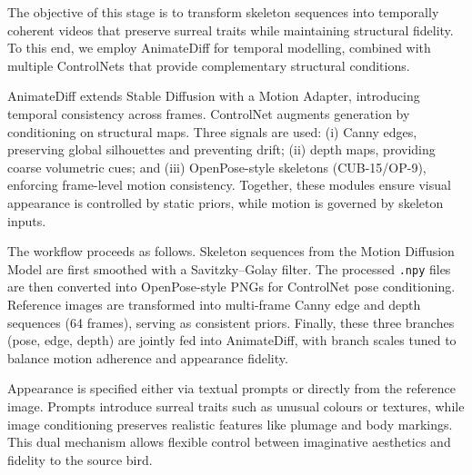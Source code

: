 \documentclass[final-report]{report-template}
\begin{document}

The objective of this stage is to transform skeleton sequences into temporally coherent videos that preserve surreal traits while maintaining structural fidelity. To this end, we employ AnimateDiff for temporal modelling, combined with multiple ControlNets that provide complementary structural conditions.

AnimateDiff extends Stable Diffusion with a Motion Adapter, introducing temporal consistency across frames. ControlNet augments generation by conditioning on structural maps. Three signals are used: (i) Canny edges, preserving global silhouettes and preventing drift; (ii) depth maps, providing coarse volumetric cues; and (iii) OpenPose-style skeletons (CUB-15/OP-9), enforcing frame-level motion consistency. Together, these modules ensure visual appearance is controlled by static priors, while motion is governed by skeleton inputs.

The workflow proceeds as follows. Skeleton sequences from the Motion Diffusion Model are first smoothed with a Savitzky–Golay filter. The processed \texttt{.npy} files are then converted into OpenPose-style PNGs for ControlNet pose conditioning. Reference images are transformed into multi-frame Canny edge and depth sequences (64 frames), serving as consistent priors. Finally, these three branches (pose, edge, depth) are jointly fed into AnimateDiff, with branch scales tuned to balance motion adherence and appearance fidelity.

Appearance is specified either via textual prompts or directly from the reference image. Prompts introduce surreal traits such as unusual colours or textures, while image conditioning preserves realistic features like plumage and body markings. This dual mechanism allows flexible control between imaginative aesthetics and fidelity to the source bird.
\end{document}
